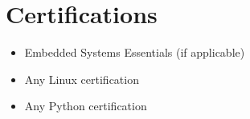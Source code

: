 \section{Certifications}

\begin{itemize}
    \item Embedded Systems Essentials (if applicable)
    \item Any Linux certification
    \item Any Python certification
\end{itemize}
